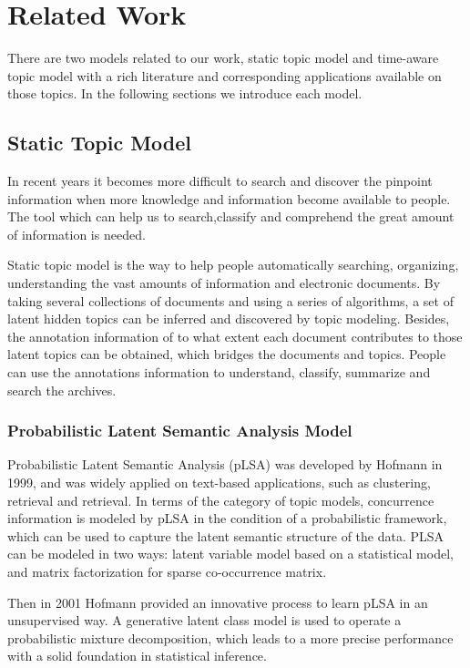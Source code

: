 \chapter{Related Work}
\label{chapterlabel2}

There are two models related to our work, static topic model and time-aware topic model with a rich literature and corresponding applications available on those topics. In the following sections we introduce each model. 

\section{Static Topic Model}
In recent years it becomes more difficult to search and discover the pinpoint information when more knowledge and information become available to people. The tool which can help us to search,classify and comprehend the great amount of information is needed. 

Static topic model is the way to help people automatically searching, organizing, understanding the vast amounts of information and electronic documents. By taking several collections of documents and using a series of algorithms, a set of latent hidden topics can be inferred  and discovered by topic modeling. Besides, the annotation information of to what extent each document contributes to those latent topics can be obtained, which bridges the documents and topics. People can use the annotations information to understand, classify, summarize and search the archives.

\subsection{Probabilistic Latent Semantic Analysis Model}

Probabilistic Latent Semantic Analysis (pLSA) was developed by Hofmann \cite{hofmann1999probabilistic} in 1999, and was widely applied on text-based applications, such as clustering, retrieval and retrieval. In terms of the category of topic models, concurrence information is modeled by pLSA in the condition of a probabilistic framework, which can be used to capture the latent semantic structure of the data. PLSA can be modeled in two ways: latent variable model based on a statistical model, and matrix factorization for sparse co-occurrence matrix.

Then in 2001 Hofmann \cite{hofmann2001unsupervised} provided an innovative process to learn pLSA in an unsupervised way. A generative latent class model is used  to operate a probabilistic mixture decomposition, which leads to a more precise performance with a solid foundation in statistical inference. 

